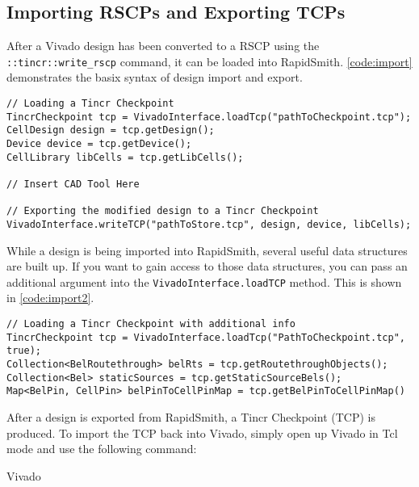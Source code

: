 \subsection{Importing RSCPs and Exporting TCPs} \label{sec:importExportTcp}
After a Vivado design has been converted to a RSCP using the
\texttt{::tincr::write\_rscp} command, it can be loaded into RapidSmith.
\autoref{code:import} demonstrates the basix syntax of design
import and export.

\begin{lstlisting}[caption=How to import and export TCP files to and from RS2,
label=code:import]
// Loading a Tincr Checkpoint
TincrCheckpoint tcp = VivadoInterface.loadTcp("pathToCheckpoint.tcp");
CellDesign design = tcp.getDesign();
Device device = tcp.getDevice();
CellLibrary libCells = tcp.getLibCells();

// Insert CAD Tool Here

// Exporting the modified design to a Tincr Checkpoint
VivadoInterface.writeTCP("pathToStore.tcp", design, device, libCells);

\end{lstlisting}

\noindent
While a design is being imported into RapidSmith, several useful data structures
are built up. If you want to gain access to those data structures, you can pass
an additional argument into the \texttt{VivadoInterface.loadTCP} method. This
is shown in \autoref{code:import2}.

\begin{lstlisting}[caption=Importing a TCP with additional information,
label=code:import2]
// Loading a Tincr Checkpoint with additional info
TincrCheckpoint tcp = VivadoInterface.loadTcp("PathToCheckpoint.tcp", true);
Collection<BelRoutethrough> belRts = tcp.getRoutethroughObjects();
Collection<Bel> staticSources = tcp.getStaticSourceBels();
Map<BelPin, CellPin> belPinToCellPinMap = tcp.getBelPinToCellPinMap()
\end{lstlisting}

\noindent
After a design is exported from RapidSmith, a Tincr Checkpoint (TCP) is
produced. To import the TCP back into Vivado, simply open up Vivado in Tcl mode
and use the following command:

\begin{code}
Vivado%
\end{code}